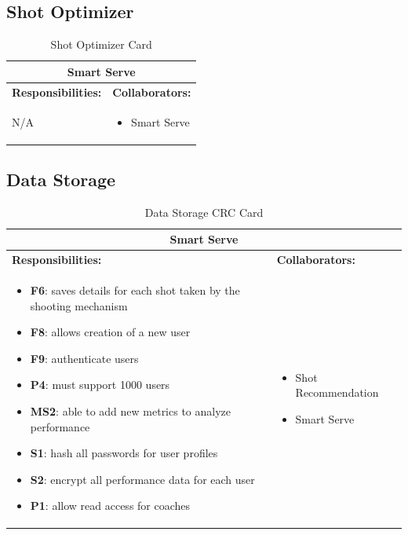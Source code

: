 \documentclass[11pt]{article}
\begin{document}
\subsection{Shot Optimizer}

\begin{table}[H]
\centering
\label{my-label}
\begin{tabular}{ | p{} | p{} | }
\hline
\multicolumn{2}{|c|}{\textbf{Smart Serve}}             \\ \hline
\textbf{Responsibilities:} & \textbf{Collaborators:} \\ \hline
N/A & \begin{itemize} \item Smart Serve \end{itemize} \\ \hline
\end{tabular}
\caption{Shot Optimizer Card}
\end{table}

\subsection{Data Storage}

\begin{table}[H]
\centering
\label{my-label}
\begin{tabular}{ | p{} | p{} | }
\hline
\multicolumn{2}{|c|}{\textbf{Smart Serve}}             \\ \hline
\textbf{Responsibilities:} & \textbf{Collaborators:} \\ \hline
\begin{itemize} 
\item \textbf{F6}: saves details for each shot taken by the shooting mechanism 
\item \textbf{F8}: allows creation of a new user
\item \textbf{F9}: authenticate users
\item \textbf{P4}: must support 1000 users
\item \textbf{MS2}: able to add new metrics to analyze performance
\item \textbf{S1}: hash all passwords for user profiles
\item \textbf{S2}: encrypt all performance data for each user
\item \textbf{P1}: allow read access for coaches
\end{itemize} 
& 
\begin{itemize} 
\item Shot Recommendation
\item Smart Serve
\end{itemize} \\ \hline
\end{tabular}
\caption{Data Storage CRC Card}
\end{table}
\end{document}
